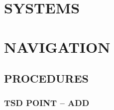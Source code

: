 \documentclass[fontInter]{TechCheck}
\begin{document}
	\cleardoublepage 

	\chapter{SYSTEMS}
	\minitoc
	\cleardoublepage

	\chapter{NAVIGATION}
	\minitoc
	\cleardoublepage

	\section{PROCEDURES}

	\subsection{TSD POINT -- ADD}
\end{document}
